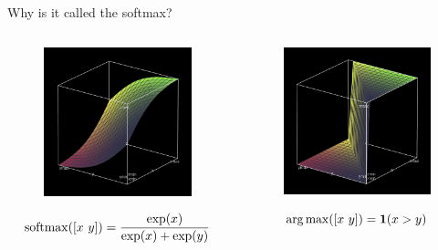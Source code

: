 \documentclass{beamer}
\begin{document}
\begin{frame}{Why is it called the softmax?}

  \begin{columns}[t]
    \begin{column}[t]{0.5\textwidth}


      \begin{figure}
        \centering
        \includegraphics[width=5cm]{softmax}
      \end{figure}
      \[\softmax([x\ y]) = \frac{\exp(x)}{\displaystyle  \exp(x) + \exp(y)}  \]
    \end{column}

    \begin{column}[t]{0.5\textwidth}


      \begin{figure}
        \centering
      \includegraphics[width=5cm]{argmax}
      \end{figure}
      \[\argmax([x\ y]) = \indicator(x > y) \]
    \end{column}
  \end{columns}
\end{frame}
\end{document}
